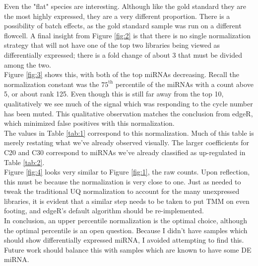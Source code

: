 \documentclass{bioinfo}
\begin{document}
Even the "flat" species are interesting. Although like the gold standard they are the most highly expressed, they are a very different proportion. There is a possibility of batch effects, as the gold standard sample was run on a different flowcell. A final insight from Figure \ref{fig:2} is that there is no single normalization strategy that will not have one of the top two libraries being viewed as differentially expressed; there is a fold change of about 3 that must be divided among the two.  \vspace{4pt} \\

Figure \ref{fig:3} shows this, with both of the top miRNAs decreasing. Recall the normalization constant was the $75^{\text{th}}$ percentile of the miRNAs with a count above 5, or about rank 125. Even though this is still far away from the top 10, qualitatively we see much of the signal which was responding to the cycle number has been muted. This qualitative observation matches the conclusion from edgeR, which minimized false positives with this normalization. \vspace{4pt} \\

The values in Table \ref{tab:1} correspond to this normalization. Much of this table is merely restating what we've already observed visually. The larger coefficients for C20 and C30 correspond to miRNAs we've already classified as up-regulated in Table \ref{tab:2}. \vspace{4pt} \\

Figure \ref{fig:4} looks very similar to Figure \ref{fig:1}, the raw counts. Upon reflection, this must be because the normalization is very close to one. Just as \citep{Tam15} needed to tweak the traditional UQ normalization to account for the many unexpressed libraries, it is evident that a similar step needs to be taken to put TMM on even footing, and edgeR's default algorithm should be re-implemented. \vspace{4pt} \\

In conclusion, an upper percentile normalization is the optimal choice, although the optimal percentile is an open question.
Because I didn't have samples which should show differentially expressed miRNA, I avoided attempting to find this. Future work should balance this with samples which are known to have some DE miRNA. 
\end{document}
